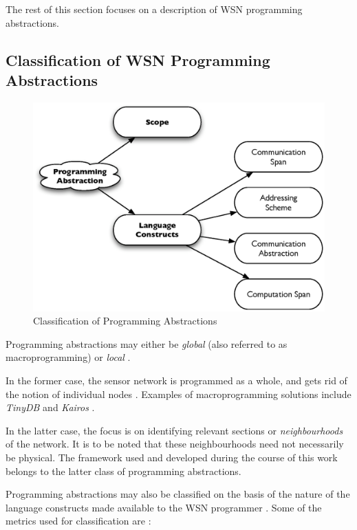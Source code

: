 The rest of this section focuses on a description of WSN programming
abstractions.

\subsection{Classification of WSN Programming Abstractions}

\begin{figure}
\centering
\includegraphics[scale=0.65]{img/ProgAbstr_Classification.eps}
\caption{Classification of Programming Abstractions} 
\label{Fig:ProgrAbstrClassification}
\end{figure} 

Programming abstractions may either be \emph{global} (also referred to 
as macroprogramming) or \emph{local} \cite{hadim_middleware:2006}. 

In the former case, the sensor network is programmed as a whole, and gets rid of
the notion of individual nodes \cite{mottola_middleware:2008}. Examples of
macroprogramming solutions include \emph{TinyDB} \cite{madden_TinyDB:2005} and
\emph{Kairos} \cite{gummadi_Kairos:2005}. 

In the latter case, the focus is on identifying relevant sections or
\emph{neighbourhoods} of the network. It is to be noted that these neighbourhoods
need not necessarily be physical. The framework used and developed during the
course of this work belongs to the latter class of programming abstractions.

Programming abstractions may also be classified on the basis of the
nature of the language constructs made available to the WSN programmer
\cite{mottola_middleware:2008}. Some of the metrics used for classification
are \cite{mottola_middleware:2008}:

